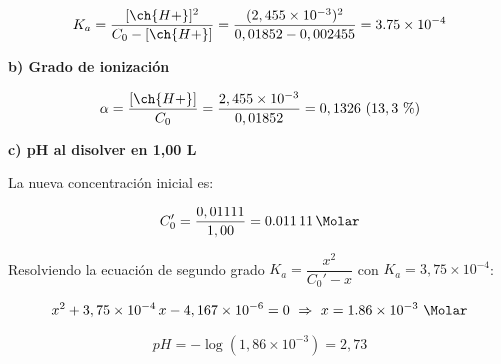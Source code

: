 \begin{exerciseEVAU}
\begin{solu}
        \begin{equation*}
            K_a = \dfrac{[\ch{H+}]^2}{C_0-[\ch{H+}]} = \dfrac{(2,455\times10^{-3})^2}{0,01852-0,002455} = \num{3.75e-4}
        \end{equation*}

        \textbf{b) Grado de ionización}

        \begin{equation*}
            \alpha = \dfrac{[\ch{H+}]}{C_0} = \dfrac{2,455\times10^{-3}}{0,01852} = 0,1326 \ (13,3\ \%)
        \end{equation*}

        \textbf{c) pH al disolver en 1,00 L}

        La nueva concentración inicial es:

        \begin{equation*}
            C_0' = \dfrac{0,01111}{1,00} = \SI{0.01111}{\Molar}
        \end{equation*}

        Resolviendo la ecuación de segundo grado \(K_a = \dfrac{x^2}{C_0'-x}\) con \(K_a = 3,75\times10^{-4}\):

        \begin{equation*}
            x^2 + 3,75\times10^{-4}\, x - 4,167\times10^{-6} = 0 \ \Rightarrow \ x = \num{1.86e-3} \ \si{\Molar}
        \end{equation*}

        \begin{equation*}
            pH = -\log(1,86\times10^{-3}) = 2,73
        \end{equation*}

    \end{solu}
\end{exerciseEVAU}
